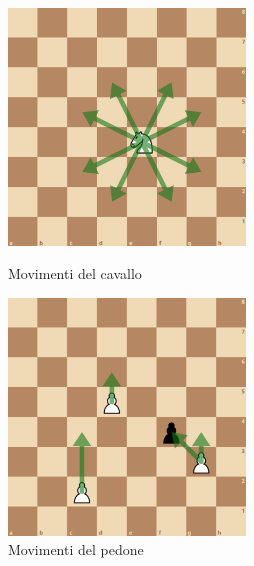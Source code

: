 \begin{figure}[!htb]
\begin{minipage}[b]{7cm}
\centering
\includegraphics[width=6.3cm]{frontmatter/figure/movimento_cavallo.pdf}
\caption{Movimenti del cavallo}
\label{fig:cavallo}
\end{minipage}
\hspace{1mm}
\begin{minipage}[b]{7cm}
\centering
\includegraphics[width=6.3cm]{frontmatter/figure/movimento_pedone.pdf}
\caption{Movimenti del pedone}
\label{fig:pedone}
\end{minipage}
\end{figure}



